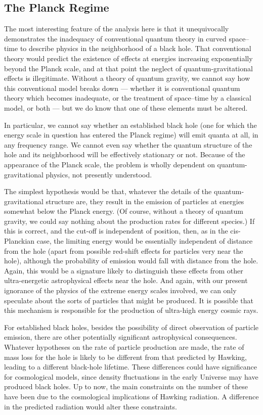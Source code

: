 \documentclass[11pt]{article}
\begin{document}
\subsection{The Planck Regime}

The most interesting feature of the analysis here is that it unequivocally
demonstrates the inadequacy of conventional quantum theory in curved
space--time to describe physics in the neighborhood of a black hole.  That
conventional theory would predict the existence of effects at energies
increasing exponentially beyond the Planck scale, and at that point the neglect
of quantum-gravitational effects is illegitimate.   Without a theory of quantum
gravity, we cannot say how this conventional model breaks down --- whether it
is conventional quantum theory which becomes inadequate, or the treatment of
space--time by a classical model, or both --- but we do
know that one of these elements must be altered.  

In particular, we cannot say whether an established black hole (one for which
the energy scale in question has entered the Planck regime) will emit quanta at
all, in any frequency range.  We cannot even say whether the quantum structure
of the hole and its neighborhood
will be effectively stationary or not.  Because of the appearance of the
Planck scale, the problem is wholly dependent on quantum-gravitational
physics, not presently understood.

The simplest hypothesis would be that, whatever the details of the
quantum-gravitational structure are, they result in the emission of particles
at energies somewhat below the Planck energy.  (Of course, without a theory of
quantum gravity, we could say nothing about the production rates for different
species.) If this is correct, and the cut-off is independent of position, then,
as in the cis-Planckian case, the limiting energy would be essentially
independent of distance from the hole (apart from possible red-shift effects
for particles very near the hole), although the  probability of emission would
fall with distance from the hole. Again, this would be a signature likely to
distinguish these effects from other ultra-energetic astrophysical effects near
the hole.  And again, with our present ignorance of the physics of the extreme
energy scales involved, we can only speculate about the sorts of particles that
might be produced.  It is possible that this mechanism is responsible for the
production of ultra-high energy cosmic rays.  

For established black holes, besides the  possibility of direct observation of 
particle emission,  there are other potentially significant astrophysical
consequences. Whatever hypotheses on the rate of particle production are made,
the rate of mass loss for the hole is likely to be different from
that predicted by Hawking, leading to a different black-hole
lifetime. These differences could have significance for cosmological models,
since density fluctuations in the early Universe may have produced black
holes.  Up to now, the main constraints on the number of these have been due to
the cosmological implications of Hawking radiation.  A difference in the
predicted radiation would alter these constraints.
\end{document}
